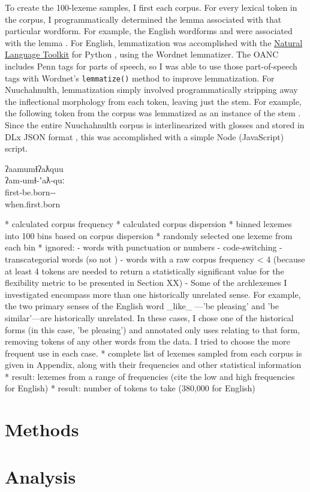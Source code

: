 To create the 100-lexeme samples, I first  each corpus. For every lexical token in the corpus, I programmatically determined the lemma associated with that particular wordform. For example, the English wordforms  and  were associated with the lemma . For English, lemmatization was accomplished with the \href{http://www.nltk.org/}{Natural Language Toolkit} for Python \parencite{BirdKleinLoper2009}, using the Wordnet lemmatizer. The OANC includes Penn tags for parts of speech, so I was able to use those part-of-speech tags with Wordnet's \texttt{lemmatize()} method to improve lemmatization. For Nuuchahnulth, lemmatization simply involved programmatically stripping away the inflectional morphology from each token, leaving just the stem. For example, the following token from the corpus was lemmatized as an instance of the stem  . Since the entire Nuuchahnulth corpus is interlinearized with glosses and stored in DLx JSON format \parencite{Hieber2020a}, this was accomplished with a simple Node (JavaScript) script.

\begin{exe}
  \ex\label{ex:3.1}
  \gllll ʔaamumɬʔaƛquu\\
         ʔam‑umɬ‑ʼaƛ‑quː\\
         first‑be.born‑‑\\
         when.first.born\\
\end{exe}

* calculated corpus frequency
* calculated corpus dispersion
* binned lexemes into 100 bins based on corpus dispersion
* randomly selected one lexeme from each bin
* ignored:
  - words with punctuation or numbers
  - code-switching
  - transcategorial words (so not )
  - words with a raw corpus frequency < 4 (because at least 4 tokens are needed to return a statistically significant value for the flexibility metric to be presented in Section XX)
  - Some of the archlexemes I investigated encompass more than one historically unrelated sense. For example, the two primary senses of the English word _like_ —'be pleasing' and 'be similar'—are historically unrelated. In these cases, I chose one of the historical forms (in this case, 'be pleasing') and annotated only uses relating to that form, removing tokens of any other words from the data. I tried to choose the more frequent use in each case.
* complete list of lexemes sampled from each corpus is given in Appendix, along with their frequencies and other statistical information
* result: lexemes from a range of frequencies (cite the low and high frequencies for English)
* result: number of tokens to take (380,000 for English)

\section{Methods}
\label{sec:3.3}

\section{Analysis}
\label{sec:3.4}
